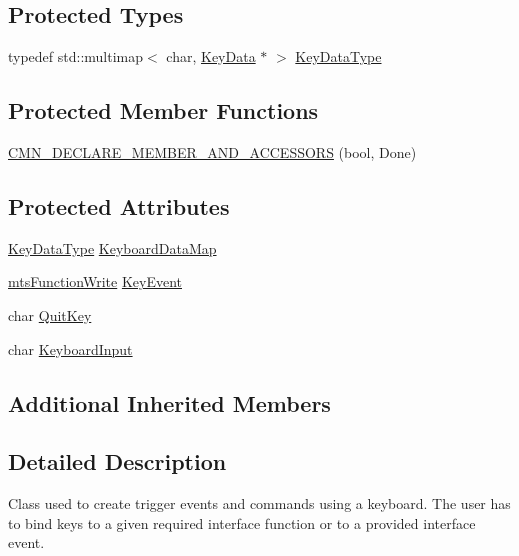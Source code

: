 \subsection*{Protected Types}
\begin{DoxyCompactItemize}
\item 
typedef std\+::multimap$<$ char, \hyperlink{structmts_keyboard_1_1_key_data}{Key\+Data} $\ast$ $>$ \hyperlink{classmts_keyboard_a48126bc1793ac0b9c701cdb3cb9c3881}{Key\+Data\+Type}
\end{DoxyCompactItemize}
\subsection*{Protected Member Functions}
\begin{DoxyCompactItemize}
\item 
\hyperlink{classmts_keyboard_a03a2bed2d8e35bc5e55618656374cd9e}{C\+M\+N\+\_\+\+D\+E\+C\+L\+A\+R\+E\+\_\+\+M\+E\+M\+B\+E\+R\+\_\+\+A\+N\+D\+\_\+\+A\+C\+C\+E\+S\+S\+O\+R\+S} (bool, Done)
\end{DoxyCompactItemize}
\subsection*{Protected Attributes}
\begin{DoxyCompactItemize}
\item 
\hyperlink{classmts_keyboard_a48126bc1793ac0b9c701cdb3cb9c3881}{Key\+Data\+Type} \hyperlink{classmts_keyboard_acb0628dad536242f1253245106a1e71f}{Keyboard\+Data\+Map}
\item 
\hyperlink{classmts_function_write}{mts\+Function\+Write} \hyperlink{classmts_keyboard_afdd1b226b01e8d9da4c14b83c7c61b82}{Key\+Event}
\item 
char \hyperlink{classmts_keyboard_a46f3784b9176a49b7782d927a0cea892}{Quit\+Key}
\item 
char \hyperlink{classmts_keyboard_a23ecc71912ee8cf5f722a93a1a29613e}{Keyboard\+Input}
\end{DoxyCompactItemize}
\subsection*{Additional Inherited Members}


\subsection{Detailed Description}
Class used to create trigger events and commands using a keyboard. The user has to bind keys to a given required interface function or to a provided interface event.

